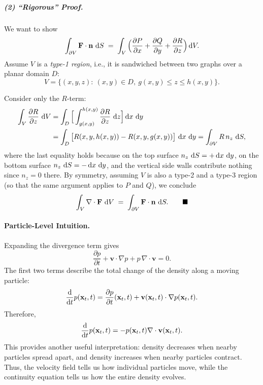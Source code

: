 \begin{nknote}
\subparagraph{(2) ``Rigorous'' Proof.}
We want to show
\[
\int_{\partial V} \mathbf{F}\cdot\mathbf{n}\,\mathop{}\!\mathrm{d} S
\;=\;
\int_V \Big(\frac{\partial P}{\partial x} + \frac{\partial Q}{\partial y} + \frac{\partial R}{\partial z}\Big)\mathop{}\!\mathrm{d} V .
\]
Assume $V$ is a \emph{type-1 region}, i.e., it is sandwiched between two graphs over a planar domain $D$:
\[
V = \big\{(x,y,z) :\ (x,y)\in D,\ g(x,y) \le z \le h(x,y)\big\}.
\]
\begin{center}
\end{center}
Consider only the $R$-term:
\begin{align*}
\int_V \frac{\partial R}{\partial z}\,\mathop{}\!\mathrm{d} V
&= \int_D \Big[\int_{g(x,y)}^{h(x,y)} \frac{\partial R}{\partial z}\,\mathop{}\!\mathrm{d} z\Big]\mathop{}\!\mathrm{d} x\,\mathop{}\!\mathrm{d} y \\
&= \int_D \big[R(x,y,h(x,y)) - R(x,y,g(x,y))\big]\,\mathop{}\!\mathrm{d} x\,\mathop{}\!\mathrm{d} y
 = \int_{\partial V} R\, n_z\,\mathop{}\!\mathrm{d} S ,
\end{align*}
where the last equality holds because on the top surface $n_z\,\mathop{}\!\mathrm{d} S = +\mathop{}\!\mathrm{d} x\,\mathop{}\!\mathrm{d} y$, on the bottom surface $n_z\,\mathop{}\!\mathrm{d} S = -\mathop{}\!\mathrm{d} x\,\mathop{}\!\mathrm{d} y$, and the vertical side walls contribute nothing since $n_z = 0$ there. By symmetry, assuming $V$ is also a type-2 and a type-3 region (so that the same argument applies to $P$ and $Q$), we conclude
\[
\int_V \nabla\cdot\mathbf{F}\,\mathop{}\!\mathrm{d} V \;=\; \int_{\partial V} \mathbf{F}\cdot\mathbf{n}\,\mathop{}\!\mathrm{d} S. \qquad\blacksquare
\]
\end{nknote}

\paragraph{Particle-Level Intuition.}
Expanding the divergence term gives
\[
\frac{\partial p}{\partial t}
+
\mathbf{v}\cdot\nabla p
+
p\,\nabla\cdot\mathbf{v}
=
0.
\]
The first two terms describe the total change of the density along a moving particle:
\[
\frac{\mathop{}\!\mathrm{d}}{\mathop{}\!\mathrm{d} t}p(\mathbf{x}_t,t)
=
\frac{\partial p}{\partial t}(\mathbf{x}_t,t)
+
\mathbf{v}(\mathbf{x}_t,t)\cdot\nabla p(\mathbf{x}_t,t).
\]
Therefore,
\[
\frac{\mathop{}\!\mathrm{d}}{\mathop{}\!\mathrm{d} t}p(\mathbf{x}_t,t)
=
-
p(\mathbf{x}_t,t)\nabla\cdot\mathbf{v}(\mathbf{x}_t,t).
\]
This provides another useful interpretation: density decreases when nearby particles spread apart, and density increases when nearby particles contract. Thus, the velocity field tells us how individual particles move, while the continuity equation tells us how the entire density evolves.

